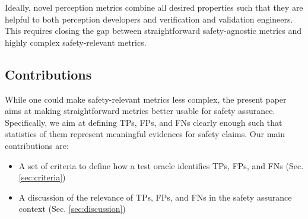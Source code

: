 \documentclass[conference]{IEEEtran}
\begin{document}
Ideally, novel perception metrics combine all desired properties such that they are helpful to both perception developers and verification and validation engineers. 
This requires closing the gap between straightforward safety-agnostic metrics and highly complex safety-relevant metrics. 

\subsection{Contributions}
While one could make safety-relevant metrics less complex, the present paper aims at making straightforward metrics better usable for safety assurance. 
Specifically, we aim at defining TPs, FPs, and FNs clearly enough such that statistics of them represent meaningful evidences for safety claims. 
Our main contributions are:
\begin{itemize}
\item A set of criteria to define how a test oracle identifies TPs, FPs, and FNs (Sec. \ref{sec:criteria})
\item A discussion of the relevance of TPs, FPs, and FNs in the safety assurance context (Sec. \ref{sec:discussion})
\end{itemize}





\end{document}
